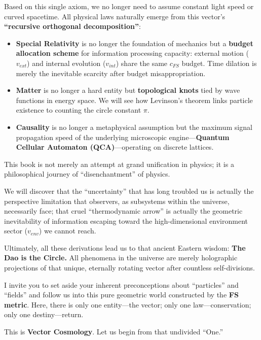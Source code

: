 Based on this single axiom, we no longer need to assume constant light speed or curved spacetime. All physical laws naturally emerge from this vector's \textbf{``recursive orthogonal decomposition''}:

\begin{itemize}
\item \textbf{Special Relativity} is no longer the foundation of mechanics but a \textbf{budget allocation scheme} for information processing capacity: external motion ($v_{ext}$) and internal evolution ($v_{int}$) share the same $c_{FS}$ budget. Time dilation is merely the inevitable scarcity after budget misappropriation.

\item \textbf{Matter} is no longer a hard entity but \textbf{topological knots} tied by wave functions in energy space. We will see how Levinson's theorem links particle existence to counting the circle constant $\pi$.

\item \textbf{Causality} is no longer a metaphysical assumption but the maximum signal propagation speed of the underlying microscopic engine---\textbf{Quantum Cellular Automaton (QCA)}---operating on discrete lattices.
\end{itemize}

This book is not merely an attempt at grand unification in physics; it is a philosophical journey of ``disenchantment'' of physics.

We will discover that the ``uncertainty'' that has long troubled us is actually the perspective limitation that observers, as subsystems within the universe, necessarily face; that cruel ``thermodynamic arrow'' is actually the geometric inevitability of information escaping toward the high-dimensional environment sector ($v_{env}$) we cannot reach.

Ultimately, all these derivations lead us to that ancient Eastern wisdom: \textbf{The Dao is the Circle.} All phenomena in the universe are merely holographic projections of that unique, eternally rotating vector after countless self-divisions.

I invite you to set aside your inherent preconceptions about ``particles'' and ``fields'' and follow us into this pure geometric world constructed by the \textbf{FS metric}. Here, there is only one entity---the vector; only one law---conservation; only one destiny---return.

This is \textbf{Vector Cosmology}. Let us begin from that undivided ``One.''

